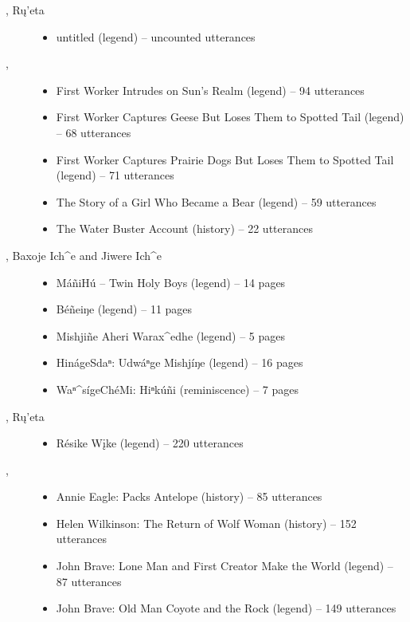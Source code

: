 \documentclass[output=paper]{LSP/langsci}
\begin{document}
\begin{description}
\item[\citet{Kennard1936}, Rų’eta]\hfill
\begin{itemize}
\item untitled (legend) -- uncounted utterances
\end{itemize}

\item[\citet{Lowie1939}, ]\hfill
\begin{itemize}
\item First Worker Intrudes on Sun’s Realm (legend) -- 94 utterances
\item First Worker Captures Geese But Loses Them to Spotted Tail (legend) -- 68 utterances
\item First Worker Captures Prairie Dogs But Loses Them to Spotted Tail (legend) -- 71 utterances
\item The Story of a Girl Who Became a Bear (legend) -- 59 utterances
\item The Water Buster Account (history) -- 22 utterances
\end{itemize}

\item[\citet{Marsh1936}, Baxoje Ich\^{}e and Jiwere Ich\^{}e]\hfill
\begin{itemize}
\item MáñiHú -- Twin Holy Boys (legend) -- 14 pages
\item Béñeiŋe (legend) -- 11 pages
\item Mishjiñe Aheri Warax\^{}edhe (legend) -- 5 pages
\item HinágeSdaⁿ: Udwáⁿge Mishjíŋe (legend) -- 16 pages
\item Waⁿ\^{}sígeChéMi: Hiⁿkúñi (reminiscence) -- 7 pages
\end{itemize}

\item[\citet{Mixco1997b}, Rų’eta]\hfill
\begin{itemize}
\item Résike Wįke (legend) -- 220 utterances
\end{itemize}

\item[\citet{ParksJonesHollow1978}, ]\hfill
\begin{itemize}
\item Annie Eagle: Packs Antelope (history) -- 85 utterances
\item Helen Wilkinson: The Return of Wolf Woman (history) -- 152 utterances
\item John Brave: Lone Man and First Creator Make the World (legend) -- 87 utterances
\item John Brave: Old Man Coyote and the Rock (legend) -- 149 utterances
\end{itemize}


\end{description}
\end{document}

